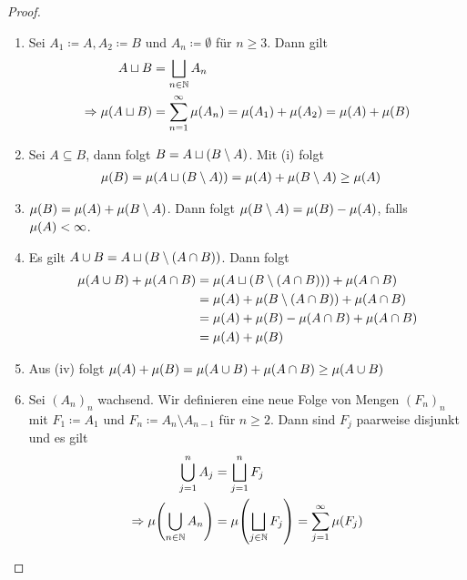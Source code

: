 \begin{satz}
    \begin{proof}
        \theoremescape
        \begin{enumerate}[label=(\roman*)]
            \item Sei $A_1 \coloneqq A, A_2 \coloneqq B$ und $A_n \coloneqq \emptyset$ für $n\geq 3$. Dann gilt
            \begin{align*}
                A \sqcup B &= \bigsqcup_{n\in\N} A_n\\
                \impl \mu\of{A\sqcup B} &= \sum_{n=1}^{\infty} \mu\of{A_n} = \mu\of{A_1} + \mu\of{A_2} = \mu\of{A} + \mu\of{B}
            \end{align*}
            \item Sei $A \subseteq B$, dann folgt $B = A \sqcup \left(B\setminus A\right)$. Mit (i) folgt
            \begin{align*}
                \mu\of{B} &= \mu\of{A \sqcup \pair{B\setminus A}} = \mu\of{A} + \mu\of{B\setminus A} \geq \mu\of{A}
            \end{align*}
            \item $\mu\of{B} = \mu\of{A} + \mu\of{B\setminus A}$. Dann folgt $\mu\of{B\setminus A} = \mu\of{B} - \mu\of{A}$, falls $\mu\of{A} < \infty$.
            \item Es gilt $A \cup B = A \sqcup \left(B\setminus\left(A \cap B\right)\right)$. Dann folgt
            \begin{align*}
                \mu\of{A \cup B} + \mu\of{A\cap B} &= \mu\of{A\sqcup\pair{B\setminus\pair{A\cap B}}} + \mu\of{A \cap B}\\
                &= \mu\of{A} + \mu\of{B\setminus \pair{A\cap B}} + \mu\of{A \cap B}\\
                &= \mu\of{A} + \mu\of{B} - \mu\of{A \cap B} + \mu\of{A \cap B}\\
                &= \mu\of{A} + \mu\of{B}
            \end{align*}
            \item Aus (iv) folgt $\mu\of{A} + \mu\of{B} = \mu\of{A\cup B} + \mu\of{A \cap B} \geq \mu\of{A \cup B}$
            \item Sei $(A_n)_n$ wachsend. Wir definieren eine neue Folge von Mengen $(F_n)_n$ mit $F_1 \coloneqq A_1$ und $F_n \coloneqq A_n \setminus A_{n-1}$ für $n\geq 2$. Dann sind $F_j$ paarweise disjunkt und es gilt
            \begin{align*}
                \bigcup_{j=1}^{n} A_j &= \bigsqcup_{j=1}^{n} F_j\\
                \impl \mu\of{\bigcup_{n\in\N} A_n} &= \mu\of{\bigsqcup_{j\in\N} F_j} = \sum_{j=1}^{\infty} \mu\of{F_j}\\

\end{align*}
\end{enumerate}
\end{proof}
\end{satz}
